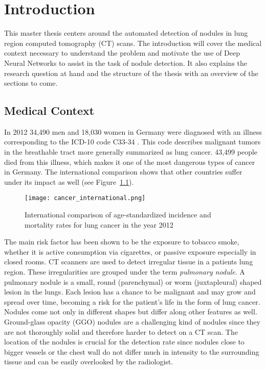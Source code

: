 \documentclass[main.tex]{subfiles}
\begin{document}
\chapter{Introduction}
This master thesis centers around the automated detection of nodules in lung region computed tomography (CT) scans. The introduction will cover the medical context necessary to understand the problem and motivate the use of Deep Neural Networks to assist in the task of nodule detection. It also explains the research question at hand and the structure of the thesis with an overview of the sections to come.

\section{Medical Context}
In 2012 34,490 men and 18,030 women in Germany were diagnosed with an illness corresponding to the ICD-10 code C33-34 \cite{koch2015krebs}. This code describes malignant tumors in the breathable tract more generally summarized as lung cancer. 43,499 people died from this illness, which makes it one of the most dangerous types of cancer in Germany. The international comparison shows that other countries suffer under its impact as well (see Figure~\ref{fig:cancInt}).

\begin{figure}[ht]
\texttt{[image: cancer\_international.png]}
\caption{International comparison of age-standardized incidence and mortality rates for lung cancer in the year 2012}
\label{fig:cancInt}
\end{figure}

The main risk factor has been shown to be the exposure to tobacco smoke, whether it is active consumption via cigarettes, or passive exposure especially in closed rooms. CT scanners are used to detect irregular tissue in a patients lung region. These irregularities are grouped under the term \textit{pulmonary nodule}. A pulmonary nodule is a small, round (parenchymal) or worm (juxtapleural) shaped lesion in the lungs. Each lesion has a chance to be malignant and may grow and spread over time, becoming a risk for the patient's life in the form of lung cancer. Nodules come not only in different shapes but differ along other features as well. Ground-glass opacity (GGO) nodules are a challenging kind of nodules since they are not thoroughly solid and therefore harder to detect on a CT scan. The location of the nodules is crucial for the detection rate since nodules close to bigger vessels or the chest wall do not differ much in intensity to the surrounding tissue and can be easily overlooked by the radiologist.
\end{document}
